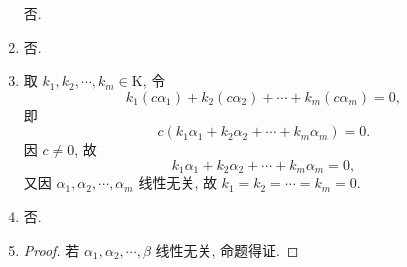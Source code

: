 \documentclass[a4paper, 11pt]{ctexart}
\begin{document}
\begin{enumerate}
        否.
    \item %
        否.
    \item %
        取 $k_1, k_2, \cdots, k_m \in \mathrm{K}$, 令
        \[
            k_1(c\alpha_1) + k_2(c\alpha_2) + \cdots + k_m(c\alpha_m) = 0,    
        \]
        即
        \[
            c(k_1\alpha_1 + k_2\alpha_2 + \cdots + k_m\alpha_m) = 0.   
        \]
        因 $c \not= 0$, 故
        \[
            k_1\alpha_1 + k_2\alpha_2 + \cdots + k_m\alpha_m = 0,   
        \]
        又因 $\alpha_1, \alpha_2, \cdots, \alpha_m$ 线性无关, 故 $k_1 = k_2 = \cdots = k_m = 0$.
    \item %
        否.
    \item %
        \begin{proof}
            若 $\alpha_1, \alpha_2, \cdots, \beta$ 线性无关, 命题得证.


\end{proof}
\end{enumerate}
\end{document}
